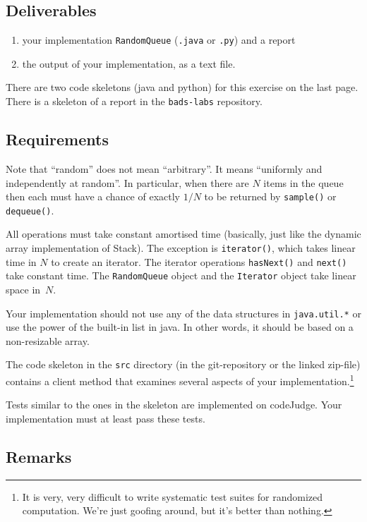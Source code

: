 \documentclass{tufte-handout}
\begin{document}
\subsection{Deliverables}

\begin{enumerate}
\item your implementation {\tt RandomQueue} ({\tt.java} or {\tt.py}) and a report
\item the output of your implementation, as a text file.
\end{enumerate}
There are two code skeletons (java and python) for this exercise on the last page.
There is a skeleton of a report in the \texttt{bads-labs} repository.

\subsection{Requirements}
Note that ``random'' does not mean ``arbitrary''.
It means ``uniformly and independently at random''.
In particular, when there are $N$ items in the queue then each must
have a chance of exactly $1/N$ to be returned by {\tt sample()} or
{\tt dequeue()}.

All operations must take constant amortised time (basically, just like
the dynamic array implementation of Stack).
The exception is {\tt iterator()}, which takes linear time in $N$ to create an iterator.
The iterator operations {\tt hasNext()} and {\tt next()} take constant
time.
The {\tt RandomQueue} object and the {\tt Iterator} object take linear
space in~$N$.

Your implementation should not use any of the data structures in \texttt{java.util.*} or use the power of the built-in list in java. In other words, it should be based on a non-resizable array. 

The code skeleton in the {\tt src} directory (in the git-repository or the linked zip-file) contains a client method
that examines several aspects of your implementation.\footnote{It is very, very difficult to write systematic test suites for
randomized computation. We're just goofing around, but it's better
than nothing.}

Tests similar to the ones in the skeleton are implemented on codeJudge. 
Your implementation must at least pass these tests.

\subsection{Remarks}
\end{document}
